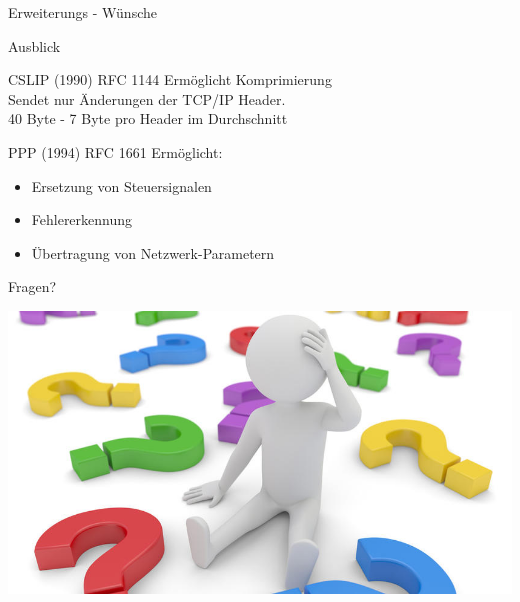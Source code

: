\documentclass[beamer]{uibk}
\begin{document}
\begin{frame}{Erweiterungs - Wünsche}
\begin{center}
  \quad\quad\quad
  \pause
  \end{center} 
\end{frame}

\begin{frame}{Ausblick}
  \begin{block}{CSLIP (1990) \hfill RFC 1144}
    Ermöglicht Komprimierung\\
    \tabto{.9cm} Sendet nur Änderungen der TCP/IP Header. \\
    \tabto{.9cm} 40 Byte - 7 Byte pro Header im Durchschnitt
  \end{block}
  \pause
  \begin{block}{PPP (1994) \hfill RFC 1661}
    Ermöglicht:
    \begin{itemize}
      \item Ersetzung von Steuersignalen
      \item Fehlererkennung
      \item Übertragung von Netzwerk-Parametern
    \end{itemize}
  \end{block}
\end{frame}

\begin{frame}{Fragen?}
\begin{center}
\includegraphics[width=\textwidth,height=\textheight,keepaspectratio]{Fragen.jpg}
\end{center}

\end{frame}
\end{document}
